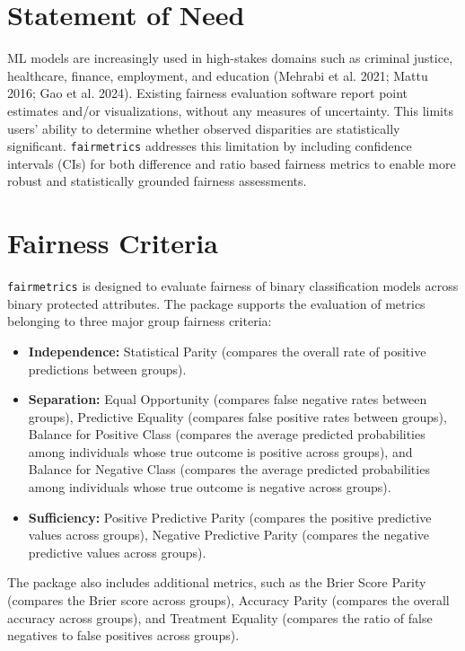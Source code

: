 \documentclass[10pt,a4paper,onecolumn]{article}
\begin{document}
\section{Statement of Need}\label{statement-of-need}

ML models are increasingly used in high-stakes domains such as criminal
justice, healthcare, finance, employment, and education (Mehrabi et al.
2021; Mattu 2016; Gao et al. 2024). Existing fairness evaluation
software report point estimates and/or visualizations, without any
measures of uncertainty. This limits users' ability to determine whether
observed disparities are statistically significant. \texttt{fairmetrics}
addresses this limitation by including confidence intervals (CIs) for
both difference and ratio based fairness metrics to enable more robust
and statistically grounded fairness assessments.

\section{Fairness Criteria}\label{fairness-criteria}

\texttt{fairmetrics} is designed to evaluate fairness of binary
classification models across binary protected attributes. The package
supports the evaluation of metrics belonging to three major group
fairness criteria:

\begin{itemize}
\item
  \textbf{Independence:} Statistical Parity (compares the overall rate
  of positive predictions between groups).
\item
  \textbf{Separation:} Equal Opportunity (compares false negative rates
  between groups), Predictive Equality (compares false positive rates
  between groups), Balance for Positive Class (compares the average
  predicted probabilities among individuals whose true outcome is
  positive across groups), and Balance for Negative Class (compares the
  average predicted probabilities among individuals whose true outcome
  is negative across groups).
\item
  \textbf{Sufficiency:} Positive Predictive Parity (compares the
  positive predictive values across groups), Negative Predictive Parity
  (compares the negative predictive values across groups).
\end{itemize}

The package also includes additional metrics, such as the Brier Score
Parity (compares the Brier score across groups), Accuracy Parity
(compares the overall accuracy across groups), and Treatment Equality
(compares the ratio of false negatives to false positives across
groups).
\end{document}

